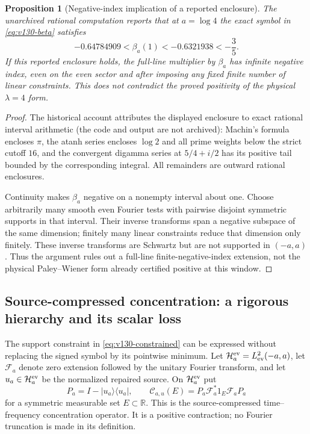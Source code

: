 \documentclass[11pt]{article}
\newtheorem{proposition}[theorem]{Proposition}
\theoremstyle{remark}
\begin{document}
\begin{proposition}[Negative-index implication of a reported enclosure]
\label{prop:v132-global-index}
The unarchived rational computation reports that at $a=\log4$ the
exact symbol in \eqref{eq:v130-beta} satisfies
\[
 -0.64784909<\beta_a(1)<-0.6321938<-\frac35.
\]
If this reported enclosure holds, the full-line multiplier by $\beta_a$ has infinite
negative index, even on the even sector and after imposing any fixed
finite number of linear constraints. This does not contradict the
proved positivity of the physical $\lambda=4$ form.
\end{proposition}
\begin{proof}
The historical account attributes the displayed enclosure to exact
rational interval arithmetic (the code and output are not archived): Machin's formula encloses $\pi$, the atanh series encloses
$\log2$ and all prime weights below the strict cutoff $16$, and the
convergent digamma series at $5/4+i/2$ has its positive tail bounded by
the corresponding integral. All remainders are outward rational
enclosures.

Continuity makes $\beta_a$ negative on a nonempty interval about one.
Choose arbitrarily many smooth even Fourier tests with pairwise
disjoint symmetric supports in that interval. Their inverse transforms
span a negative subspace of the same dimension; finitely many linear
constraints reduce that dimension only finitely. These inverse
transforms are Schwartz but are not supported in $(-a,a)$. Thus the
argument rules out a full-line finite-negative-index extension, not the
physical Paley--Wiener form already certified positive at this window.
\end{proof}

\subsection*{Source-compressed concentration: a rigorous hierarchy and its scalar loss}

The support constraint in \eqref{eq:v130-constrained} can be expressed
without replacing the signed symbol by its pointwise minimum.  Let
$\mathcal H_a^{\rm ev}=L^2_{\rm ev}(-a,a)$, let $\mathcal F_a$ denote
zero extension followed by the unitary Fourier transform, and let
$u_a\in\mathcal H_a^{\rm ev}$ be the normalized repaired source.  On
$\mathcal H_a^{\rm ev}$ put
\[
 P_a=I-|u_a\rangle\langle u_a|,
 \qquad
 \mathcal C_{a,u}(E)
 =P_a\mathcal F_a^*1_E\mathcal F_aP_a
\]
for a symmetric measurable set $E\subset\mathbb R$.  This is the
source-compressed time--frequency concentration operator.  It is a
positive contraction; no Fourier truncation is made in its definition.
\end{document}
